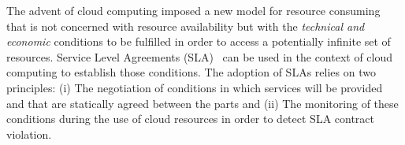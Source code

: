


The advent of cloud computing imposed a new model for resource consuming that is not concerned
 with resource availability but with the \textit{technical and economic} conditions to be fulfilled in order to access a potentially infinite set of resources. 
Service Level Agreements (SLA)~\cite{SLA} can be used in the context of cloud computing to establish those conditions. The adoption of SLAs relies on two principles: (i) The negotiation of conditions in which services will be provided and that are statically agreed between the parts and (ii) The monitoring of these conditions during the use of cloud resources in order to detect SLA contract violation.

